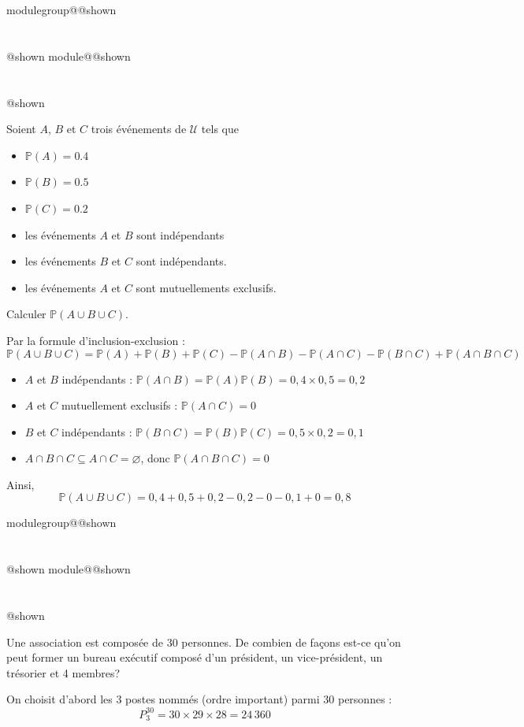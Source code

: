 \documentclass{Evaluation}
\makeatletter
\newcommand{\currentmodulekey}{}
\newcommand{\currentmoduletitle}{}
\newcommand{\currentgroupkey}{}
\newcommand{\currentgrouptitle}{}
\newcommand{\showmoduleifneeded}{%
  \ifx\currentgroupkey\empty\else
    \expandafter\ifx\csname modulegroup@\currentgroupkey @shown\endcsname\relax
      \section*{\currentgrouptitle}%
      \expandafter\gdef\csname modulegroup@\currentgroupkey @shown\endcsname{1}%
    \fi
  \fi
  \expandafter\ifx\csname module@\currentmodulekey @shown\endcsname\relax
    \section*{\currentmoduletitle}%
    \expandafter\gdef\csname module@\currentmodulekey @shown\endcsname{1}%
  \fi
}
\newenvironment{H23}{\showmoduleifneeded}{}
\makeatother
\begin{document}
\begin{questions}
\begin{H23}
\question {} %
Soient $A$, $B$ et $C$ trois événements de $\mathcal{U}$ tels que 
\begin{itemize}
\item $\mathbb{P}(A)=0.4$
\item $\mathbb{P}(B)=0.5$
\item $\mathbb{P}(C)=0.2$
\item les événements $A$ et $B$ sont indépendants
\item les événements $B$ et $C$ sont indépendants.
\item les événements $A$ et $C$ sont mutuellements exclusifs.
\end{itemize}
Calculer $\mathbb{P}(A \cup B \cup C)$.

\begin{solution}
Par la formule d'inclusion-exclusion :
$$\mathbb{P}(A \cup B \cup C) = \mathbb{P}(A) + \mathbb{P}(B) + \mathbb{P}(C) - \mathbb{P}(A \cap B) - \mathbb{P}(A \cap C) - \mathbb{P}(B \cap C) + \mathbb{P}(A \cap B \cap C)$$

\begin{itemize}
\item $A$ et $B$ indépendants : $\mathbb{P}(A \cap B) = \mathbb{P}(A)\mathbb{P}(B) = 0{,}4 \times 0{,}5 = 0{,}2$
\item $A$ et $C$ mutuellement exclusifs : $\mathbb{P}(A \cap C) = 0$
\item $B$ et $C$ indépendants : $\mathbb{P}(B \cap C) = \mathbb{P}(B)\mathbb{P}(C) = 0{,}5 \times 0{,}2 = 0{,}1$
\item $A \cap B \cap C \subseteq A \cap C = \varnothing$, donc $\mathbb{P}(A \cap B \cap C) = 0$
\end{itemize}

Ainsi,
$$\mathbb{P}(A \cup B \cup C) = 0{,}4 + 0{,}5 + 0{,}2 - 0{,}2 - 0 - 0{,}1 + 0 = 0{,}8$$
\end{solution}
\end{H23}

\begin{H23}
\question {} %
Une association est composée de 30 personnes. De combien de façons est-ce qu'on peut former un bureau exécutif composé d'un président, un vice-président, un trésorier et 4 membres?

\begin{solution}
On choisit d'abord les 3 postes nommés (ordre important) parmi 30 personnes :
$$P^{30}_3 = 30 \times 29 \times 28 = 24\,360$$


\end{solution}
\end{H23}
\end{questions}
\end{document}
